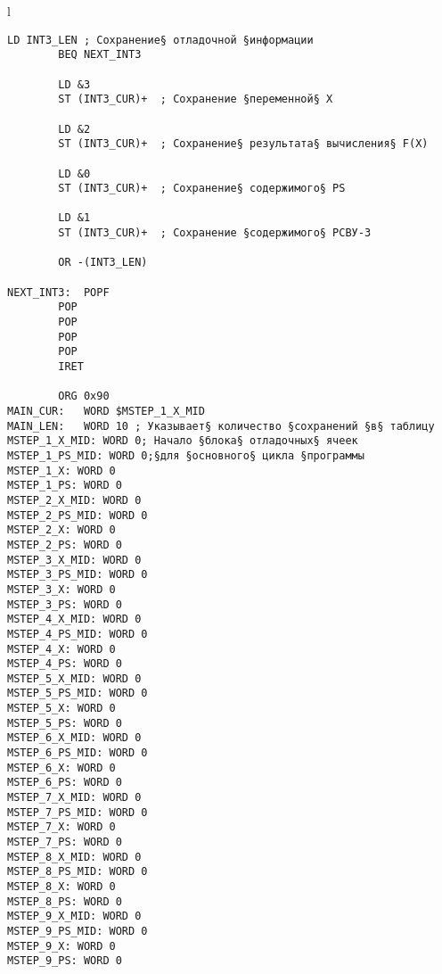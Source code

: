\newpage
\noindent\begin{center}
	\begin{tabular}{l}
		\begin{lstlisting}[basicstyle=\ttfamily]
		LD INT3_LEN	; Сохранение§ отладочной §информации
		BEQ NEXT_INT3

		LD &3
		ST (INT3_CUR)+	; Сохранение §переменной§ X
	
		LD &2
		ST (INT3_CUR)+	; Сохранение§ результата§ вычисления§ F(X)
		
		LD &0
		ST (INT3_CUR)+	; Сохранение§ содержимого§ PS
		
		LD &1
		ST (INT3_CUR)+	; Сохранение §содержимого§ РСВУ-3
		
		OR -(INT3_LEN)
		
NEXT_INT3:	POPF
		POP
		POP
		POP
		POP
		IRET
		
		ORG 0x90
MAIN_CUR:	WORD $MSTEP_1_X_MID
MAIN_LEN:	WORD 10	; Указывает§ количество §сохранений §в§ таблицу
MSTEP_1_X_MID: WORD 0; Начало §блока§ отладочных§ ячеек 
MSTEP_1_PS_MID: WORD 0;§для §основного§ цикла §программы
MSTEP_1_X: WORD 0
MSTEP_1_PS: WORD 0
MSTEP_2_X_MID: WORD 0
MSTEP_2_PS_MID: WORD 0
MSTEP_2_X: WORD 0
MSTEP_2_PS: WORD 0
MSTEP_3_X_MID: WORD 0
MSTEP_3_PS_MID: WORD 0
MSTEP_3_X: WORD 0
MSTEP_3_PS: WORD 0
MSTEP_4_X_MID: WORD 0
MSTEP_4_PS_MID: WORD 0
MSTEP_4_X: WORD 0
MSTEP_4_PS: WORD 0
MSTEP_5_X_MID: WORD 0
MSTEP_5_PS_MID: WORD 0
MSTEP_5_X: WORD 0
MSTEP_5_PS: WORD 0
MSTEP_6_X_MID: WORD 0
MSTEP_6_PS_MID: WORD 0
MSTEP_6_X: WORD 0
MSTEP_6_PS: WORD 0
MSTEP_7_X_MID: WORD 0
MSTEP_7_PS_MID: WORD 0
MSTEP_7_X: WORD 0
MSTEP_7_PS: WORD 0
MSTEP_8_X_MID: WORD 0
MSTEP_8_PS_MID: WORD 0
MSTEP_8_X: WORD 0
MSTEP_8_PS: WORD 0
MSTEP_9_X_MID: WORD 0
MSTEP_9_PS_MID: WORD 0
MSTEP_9_X: WORD 0
MSTEP_9_PS: WORD 0
		
		\end{lstlisting}
	\end{tabular}
\end{center}
\newpage

